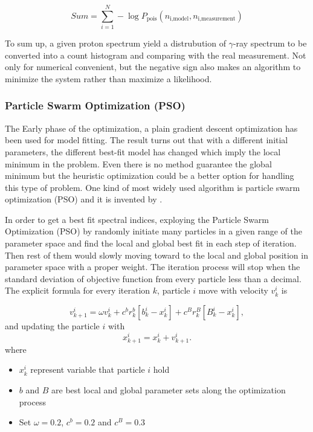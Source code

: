 \begin{equation}
    Sum = \sum_{i=1}^{N} -\log P_{\text{pois}}(n_{\text{i,model}}, n_{\text{i,measurement}})
    \label{eq:loglikelihood}
\end{equation}

To sum up, a given proton spectrum yield a distrubution of $\gamma$-ray
spectrum to be converted into a count histogram and comparing with the 
real measurement. Not only for numerical convenient, but the negative sign 
also makes an algorithm to minimize the system rather than maximize 
a likelihood.

\subsubsection{Particle Swarm Optimization (PSO)}

The Early phase of the optimization, a plain gradient descent 
optimization has been used for model fitting. The result turns out 
that with a different initial parameters, the different best-fit model 
has changed which imply the local minimum in the problem. 
Even there is no method guarantee the global minimum but the heuristic
optimization could be a better option for handling this type of problem.
One kind of most widely used algorithm is particle swarm
optimization (PSO) and it is invented by \cite{pso_optimize}.

In order to get a best fit spectral indices, exploying the Particle Swarm Optimization (PSO)
by randomly initiate many particles in a given range of the parameter space and find the
local and global best fit in each step of iteration. Then rest of them would slowly moving
toward to the local and global position in parameter space with a proper weight. 
The iteration process will stop when the standard deviation of objective function from 
every particle less than a decimal. The explicit formula for every iteration $k$,
particle $i$ move with velocity $v_k^i$ is

\begin{equation}
    v^i_{k+1} = \omega v^i_k + c^br^b_k[b^i_k-x^i_k] + c^Br^B_k[B^i_k-x^i_k],
    \label{eq:pso}
\end{equation}
and updating the particle $i$ with
\begin{equation}
    x^i_{k+1} = x^i_k + v^i_{k+1}.
    \label{eq:pso_update}
\end{equation}
where
\begin{itemize}
    \item $x^i_k$ represent variable that particle $i$ hold
    \item $b$ and $B$ are best local and global parameter sets along the optimization process
    \item Set $\omega = 0.2$, $c^b = 0.2$ and $c^B = 0.3$
\end{itemize}

